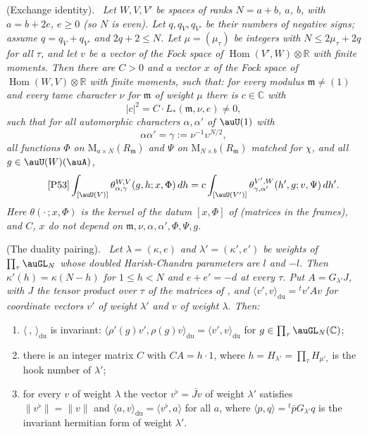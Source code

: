 \documentclass[10pt]{amsart}
\theoremstyle{definition}
\theoremstyle{remark}
\newcommand{\C}{\mathbb C}
\newcommand{\R}{\mathbb R}
\providecommand{\auHom}{\operatorname{Hom}}
\providecommand{\pcMat}{\mathrm M}
\providecommand{\pcR}{R}
\providecommand{\pcm}{\mathfrak m}
\providecommand{\pgsdu}{\mathrm{du}}
\newenvironment{quotedthm}[2]{\par\medskip\noindent\begingroup
  \textbf{#1}#2.\ \itshape\ignorespaces}{\endgroup\par\medskip}
\begin{document}
\begin{quotedthm}{\cite[Theorem~3.2]{P53}}{ (Exchange identity)}
Let $W,V,V'$ be spaces of ranks $N=a+b$, $a$, $b$, with $a=b+2e$, $e\ge0$ (so $N$ is even). Let
$q,q_V,q_{V'}$ be their numbers of negative signs; assume $q=q_V+q_{V'}$ and $2q+2\le N$. Let
$\mu=(\mu_\tau)$ be integers with $N\le2\mu_\tau+2q$ for all $\tau$, and let $v$ be a vector of the
Fock space of $\auHom(V',W)\otimes\R$ with finite moments. Then there are $C>0$ and a vector $x$ of
the Fock space of $\auHom(W,V)\otimes\R$ with finite moments, such that: for every modulus
$\pcm\ne(1)$ and every tame character $\nu$ for $\pcm$ of weight $\mu$ there is $c\in\C$ with
\[
|c|^2=C\cdot L_*(\pcm,\nu,e)\ne0,
\]
such that for all automorphic characters $\alpha,\alpha'$ of $\auU(1)$ with
\[
\alpha\alpha'=\gamma:=\nu^{-1}\upsilon^{N/2},
\]
all functions $\Phi$ on $\pcMat_{a\times N}(\pcR_\pcm)$ and $\Psi$ on $\pcMat_{N\times b}(\pcR_\pcm)$
matched for $\chi$, and all $g\in\auU(W)(\auA)$,
\begin{equation*}\tag*{{\cite[(12)]{P53}}}
\int_{[\auU(V)]}\theta^{W,V}_{\alpha,\gamma}(g,h;x,\Phi)\,dh=c\int_{[\auU(V')]}
\theta^{V',W}_{\gamma,\alpha'}(h',g;v,\Psi)\,dh' .
\end{equation*}
Here $\theta(\cdot\,;x,\Phi)$ is the kernel of the datum $[x,\Phi]$ of {\cite[\S2.3]{P53}} (matrices
in the frames), and $C$, $x$ do not depend on $\pcm,\nu,\alpha,\alpha',\Phi,\Psi,g$.
\end{quotedthm}

\begin{quotedthm}{\cite[Lemma~5.26]{P53}}{ (The duality pairing)}
Let $\lambda=(\kappa,e)$ and $\lambda'=(\kappa',e')$ be weights of $\prod_\tau\auGL_N$ whose doubled
Harish-Chandra parameters are $l$ and $-l$. Then $\kappa'(h)=\kappa(N-h)$ for $1\le h<N$ and
$e+e'=-d$ at every $\tau$. Put $A=G_{\lambda'}J$, with $J$ the tensor product over $\tau$ of the
matrices of {\cite[Lemma~5.25]{P53}}, and $\langle v',v\rangle_{\pgsdu}={}^tv'Av$ for coordinate vectors
$v'$ of weight $\lambda'$ and $v$ of weight $\lambda$. Then:
\begin{enumerate}
\item[(P1)] $\langle\ ,\,\rangle_\pgsdu$ is invariant: $\langle\rho'(g)v',\rho(g)v\rangle_\pgsdu=
\langle v',v\rangle_\pgsdu$ for $g\in\prod_\tau\auGL_N(\C)$;
\item[(P2)] there is an integer matrix $C$ with $CA=h\cdot1$, where $h=H_{\lambda'}=\prod_\tau
H_{\mu'_\tau}$ is the hook number of $\lambda'$;
\item[(P3)] for every $v$ of weight $\lambda$ the vector $v^\flat=\overline{Jv}$ of weight $\lambda'$
satisfies $\|v^\flat\|=\|v\|$ and $\langle a,v\rangle_\pgsdu=\langle v^\flat,a\rangle$ for all $a$,
where $\langle p,q\rangle={}^t\bar pG_{\lambda'}q$ is the invariant hermitian form of weight
$\lambda'$.
\end{enumerate}
\end{quotedthm}
\end{document}
